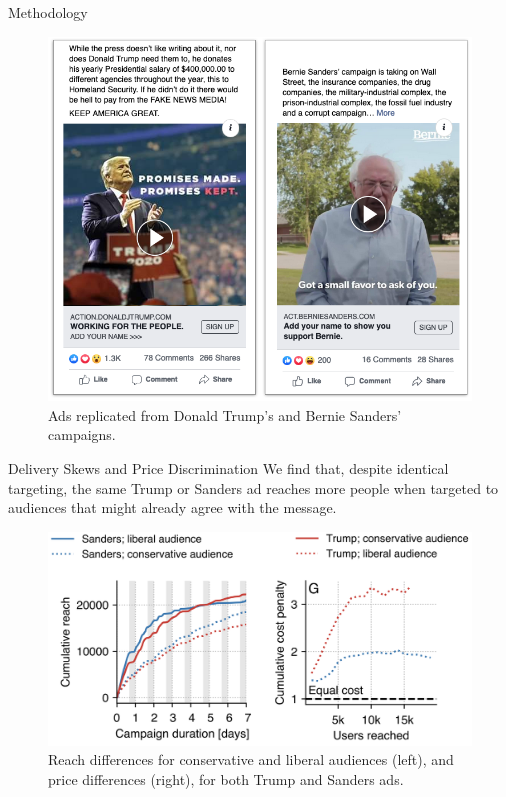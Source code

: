 \documentclass[final,hyperref={pdfpagelabels=false}]{beamer}
\begin{document}
\begin{frame}[t]
\begin{columns}[t]
\begin{column}{.45\textwidth}
\begin{block}{\Large Methodology}
        \begin{figure}
          \includegraphics[scale=.9]{figures/ads-issues.png}
          \caption{\hspace{.01em} Ads replicated from Donald Trump's and Bernie Sanders' campaigns.}
          \label{fig:ads}
        \end{figure}
      \end{block}

      \begin{block}{\Large Delivery Skews and Price Discrimination}
        We find that, despite identical targeting, the same Trump or Sanders ad reaches more people when targeted to audiences that might already agree with the message.\vspace{.5em}

        \begin{figure}
          \includegraphics[scale=1.25]{figures/result-1.png}
          \caption{\hspace{.01em} Reach differences for conservative and liberal audiences (left), and price differences (right), for both Trump and Sanders ads.}
        \end{figure}


\end{block}
\end{column}
\end{columns}
\end{frame}
\end{document}
